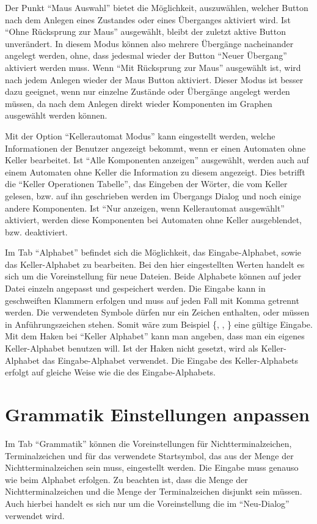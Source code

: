 Der Punkt "`Maus Auswahl"' bietet die Möglichkeit, auszuwählen, welcher Button
nach dem Anlegen eines Zustandes oder eines Überganges aktiviert wird. Ist "`Ohne
Rücksprung zur Maus"' ausgewählt, bleibt der zuletzt aktive Button unverändert.
In diesem Modus können also mehrere Übergänge nacheinander angelegt werden, ohne,
dass jedesmal wieder der Button "`Neuer Übergang"' aktiviert werden muss. Wenn
"`Mit Rücksprung zur Maus"' ausgewählt ist, wird nach jedem Anlegen wieder der
Maus Button aktiviert. Dieser Modus ist besser dazu geeignet, wenn nur einzelne
Zustände oder Übergänge angelegt werden müssen, da nach dem Anlegen direkt wieder
Komponenten im Graphen ausgewählt werden können.\vspace{10pt}

Mit der Option "`Kellerautomat Modus"' kann eingestellt werden, welche Informationen
der Benutzer angezeigt bekommt, wenn er einen Automaten ohne Keller bearbeitet. Ist
"`Alle Komponenten anzeigen"' ausgewählt, werden auch auf einem Automaten ohne Keller
die Information zu diesem angezeigt. Dies betrifft die "`Keller Operationen Tabelle"',
das Eingeben der Wörter, die vom Keller gelesen, bzw. auf ihn geschrieben
werden im Übergangs Dialog und noch einige andere Komponenten. Ist "`Nur anzeigen, wenn
Kellerautomat ausgewählt"' aktiviert, werden diese Komponenten bei Automaten ohne
Keller ausgeblendet, bzw. deaktiviert.\vspace{10pt}

Im Tab "`Alphabet"' befindet sich die Möglichkeit, das Eingabe-Alphabet, sowie
das Keller-Alphabet zu bearbeiten. Bei den hier eingestellten Werten handelt es sich
um die Voreinstellung für neue Dateien. Beide Alphabete können auf jeder Datei
einzeln angepasst und gespeichert werden. Die Eingabe kann in geschweiften
Klammern erfolgen und muss auf jeden Fall mit Komma getrennt werden. Die
verwendeten Symbole dürfen nur ein Zeichen enthalten, oder müssen in
Anführungszeichen stehen. Somit wäre zum Beispiel \{, , 
\} eine gültige Eingabe. Mit dem Haken bei "`Keller Alphabet"' kann
man angeben, dass man ein eigenes Keller-Alphabet benutzen will. Ist der Haken
nicht gesetzt, wird als Keller-Alphabet das Eingabe-Alphabet verwendet. Die
Eingabe des Keller-Alphabets erfolgt auf gleiche Weise wie die des
Eingabe-Alphabets.


\section{Grammatik Einstellungen anpassen}

Im Tab "`Grammatik"' können die Voreinstellungen für Nichtterminalzeichen,
Terminalzeichen und für das verwendete Startsymbol, das aus der Menge der
Nichtterminalzeichen sein muss, eingestellt werden. Die Eingabe muss genauso wie
beim Alphabet erfolgen. Zu beachten ist, dass die Menge der Nichtterminalzeichen
und die Menge der Terminalzeichen disjunkt sein müssen. Auch hierbei handelt es
sich nur um die Voreinstellung die im "`Neu-Dialog"' verwendet wird.